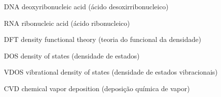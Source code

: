 \documentclass[
	12pt,				%
	openright,			%
	twoside,			%
	a4paper,			%
	chapter=TITLE,		%
	english,			%
	french,				%
	spanish,			%
	brazil				%
	]{abntex2}
\begin{document}
%  

\sloppy
\listoffigures*
\cleardoublepage

\listoftables*
\cleardoublepage

\begin{siglas}
  \item[DNA] deoxyribonucleic acid (ácido desoxirribonucleico)
  \item[RNA] ribonucleic acid (ácido ribonucleico)
  \item[DFT] density functional theory (teoria do funcional da densidade)
  \item[DOS] density of states (densidade de estados)
  \item[VDOS] vibrational density of states (densidade de estados vibracionais)
  \item[CVD] chemical vapor deposition (deposição química de vapor)
\end{siglas}


\tableofcontents*
\cleardoublepage



\textual

\end{document}
